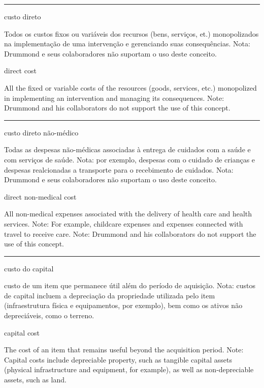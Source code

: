 \documentclass[
]{book}
\begin{document}
\begin{center}\rule{0.5\linewidth}{0.5pt}\end{center}

custo direto

Todos os custos fixos ou variáveis dos recursos (bens, serviços, et.) monopolizados na implementação de uma intervenção e gerenciando suas consequências. Nota: Drummond e seus colaboradores não suportam o uso deste conceito.

direct cost

All the fixed or variable costs of the resources (goods, services, etc.) monopolized in implementing an intervention and managing its consequences. Note: Drummond and his collaborators do not support the use of this concept.

\begin{center}\rule{0.5\linewidth}{0.5pt}\end{center}

custo direto não-médico

Todas as despesas não-médicas associadas à entrega de cuidados com a saúde e com serviços de saúde. Nota: por exemplo, despesas com o cuidado de crianças e despesas realcionadas a transporte para o recebimento de cuidados. Nota: Drummond e seus colaboradores não suportam o uso deste conceito.

direct non-medical cost

All non-medical expenses associated with the delivery of health care and health services. Note: For example, childcare expenses and expenses connected with travel to receive care. Note: Drummond and his collaborators do not support the use of this concept.

\begin{center}\rule{0.5\linewidth}{0.5pt}\end{center}

custo do capital

custo de um item que permanece útil além do período de aquisição. Nota: custos de capital incluem a depreciação da propriedade utilizada pelo item (infraestrutura física e equipamentos, por exemplo), bem como os ativos não depreciáveis, como o terreno.

capital cost

The cost of an item that remains useful beyond the acquisition period. Note: Capital costs include depreciable property, such as tangible capital assets (physical infrastructure and equipment, for example), as well as non-depreciable assets, such as land.
\end{document}

